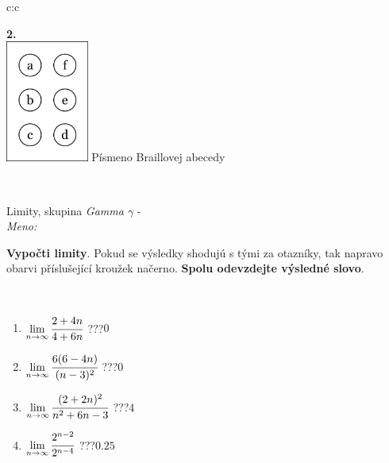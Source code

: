 \documentclass[10pt]{report}
\begin{document}
\begin{tabular}{c:c}
\begin{minipage}[c][104.5mm][t]{0.5\linewidth}
\begin{center}
\begin{minipage}{0.20\linewidth}
\begin{center}
{\Huge\bfseries 2.} \\[2mm]
\includegraphics[height=40mm]{../images/braille.png}
{\small Písmeno Braillovej abecedy}
\end{center}
\end{minipage}
\end{center}
\end{minipage}
\\ \hdashline
\begin{minipage}[c][104.5mm][t]{0.5\linewidth}
\begin{center}
\vspace{7mm}
{\huge Limity, skupina \textit{Gamma $\gamma$} -}\\[5mm]
\textit{Meno:}\phantom{xxxxxxxxxxxxxxxxxxxxxxxxxxxxxxxxxxxxxxxxxxxxxxxxxxxxxxxxxxxxxxxxx}\\[5mm]
\begin{minipage}{0.95\linewidth}
\begin{center}
\textbf{Vypočti limity}. Pokud se výsledky shodujú s tými za otazníky, tak napravo\\obarvi příslušející kroužek načerno. \textbf{Spolu odevzdejte výsledné slovo}.
\end{center}
\end{minipage}
\\[1mm]
\begin{minipage}{0.79\linewidth}
\begin{center}
\begin{varwidth}{\linewidth}
\begin{enumerate}
\normalsize
\item $\lim\limits_{n\to\infty}\cfrac{2+4n}{4+6n}$\quad \dotfill\; ???\;\dotfill \quad $0$
\item $\lim\limits_{n\to\infty}\cfrac{6(6-4n)}{(n-3)^2}$\quad \dotfill\; ???\;\dotfill \quad $0$
\item $\lim\limits_{n\to\infty}\cfrac{(2+2n)^2}{n^2+6n-3}$\quad \dotfill\; ???\;\dotfill \quad $4$
\item $\lim\limits_{n\to\infty}\cfrac{2^{n-2}}{2^{n-4}}$\quad \dotfill\; ???\;\dotfill \quad $0.25$

\end{enumerate}
\end{varwidth}
\end{center}
\end{minipage}
\end{center}
\end{minipage}
\end{tabular}
\end{document}

